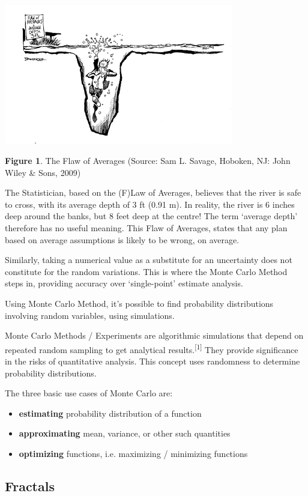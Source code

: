 \documentclass{resonance}
\begin{document}
\includegraphics[width=10cm]{the-flaw-of-averages}

\scriptsize{\textbf{Figure 1}. The Flaw of Averages (Source: Sam L. Savage, Hoboken, NJ: John Wiley \& Sons, 2009)}

\normalsize
The Statistician, based on the (F)Law of Averages, believes that the river is safe to cross, with its average depth of 3 ft (0.91 m). In reality, the river is 6 inches deep around the banks, but 8 feet deep at the centre! The term ‘average depth’ therefore has no useful meaning. This Flaw of Averages, states that any plan based on average assumptions is likely to be wrong, on average.

Similarly, taking a numerical value as a substitute for an uncertainty does not constitute for the random variations. This is where the Monte Carlo Method steps in, providing accuracy over ‘single-point' estimate analysis.

Using Monte Carlo Method, it's possible to find probability distributions involving random variables, using simulations.

Monte Carlo Methods / Experiments are algorithmic simulations that depend on repeated random sampling to get analytical results.\textsuperscript{[1]} They provide significance in the risks of quantitative analysis. This concept uses randomness to determine probability distributions.

The three basic use cases of Monte Carlo are:
\begin{itemize}
	\item \textbf{estimating} probability distribution of a function
	\item \textbf{approximating} mean, variance, or other such quantities
	\item \textbf{optimizing} functions, i.e. maximizing / minimizing functions
\end{itemize}

\subsection*{Fractals}
\end{document}
